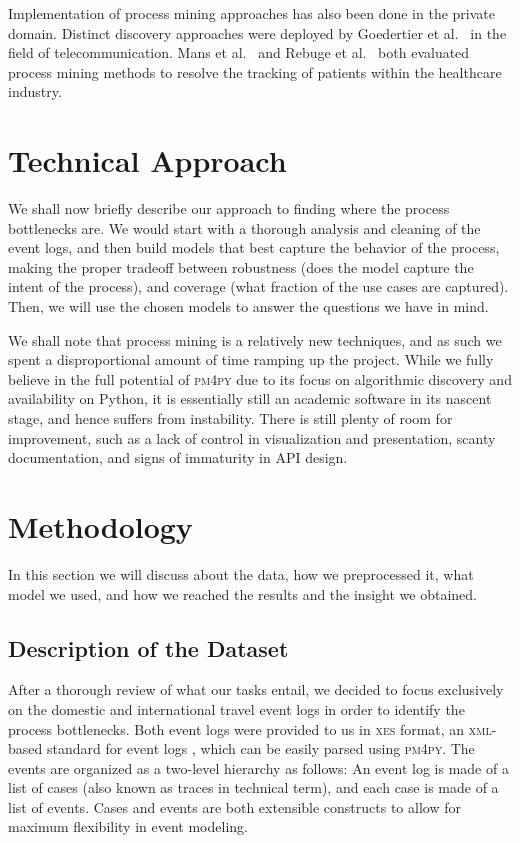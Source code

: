 \documentclass[conference]{IEEEtran}
\begin{document}
Implementation of process mining approaches has also been done in
the private domain. Distinct discovery approaches were
deployed by Goedertier et al.~\cite{GoDW2011} in the field of
telecommunication. Mans
et al.~\cite{MaSc2008} and Rebuge et al.~\cite{ReBu2012} both
evaluated process mining methods
to resolve the tracking of patients within the healthcare industry.

\section{Technical Approach}
\label{section-technical}

We shall now briefly describe our approach to finding
where the process bottlenecks are. We would start with a thorough analysis and
cleaning of the event logs, and then
build models that best capture the behavior of the
process, making the proper tradeoff
between robustness (does the model capture the intent of the process),
and coverage (what fraction of the use cases are captured).
 Then, we will use the
chosen models to answer the questions we have in mind.

We shall note that process mining is a relatively new techniques, and
as such we spent a disproportional amount of time ramping up the project.
While we fully believe in the full potential of \textsc{pm4py} due to
its focus on algorithmic discovery and availability
on Python, it is
essentially still an academic software in its nascent stage, and 
hence suffers from instability. There is still plenty of room for
improvement, such as a lack of control in visualization and
presentation, scanty documentation, and signs of immaturity in API design.

\section{Methodology}
\label{section-methodology}

In this section we will discuss about the data, 
how we preprocessed it, what model we used, and how
we reached the results and the insight we obtained.

\subsection{Description of the Dataset}

After a thorough review of what our tasks entail, we decided to focus
exclusively on the domestic and international travel event logs in order
to identify the process bottlenecks.  Both event logs
were provided to us in \textsc{xes} format,
an \textsc{xml}-based standard for event logs \cite{XES2021}, which can
be easily parsed using \textsc{pm4py}.
The events are organized as a two-level hierarchy as follows:
An event log is made of a list of cases
(also known as traces in technical
term), and each case is made of a list of events. Cases and
events are both extensible constructs to allow for maximum flexibility in
event modeling.
\end{document}
